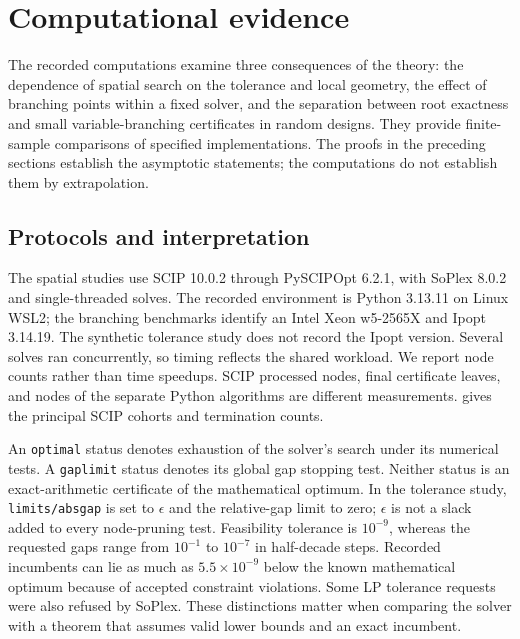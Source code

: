 \section{Computational evidence}
\label{sec:experiments}

The recorded computations examine three consequences of the theory: the
dependence of spatial search on the tolerance and local geometry, the effect
of branching points within a fixed solver, and the separation between root
exactness and small variable-branching certificates in random designs.
They provide finite-sample comparisons of specified implementations.
The proofs in the preceding sections establish the asymptotic statements;
the computations do not establish them by extrapolation.

\subsection{Protocols and interpretation}
\label{experiments:protocols}

The spatial studies use SCIP 10.0.2 through PySCIPOpt 6.2.1, with SoPlex
8.0.2 and single-threaded solves. The recorded environment is Python
3.13.11 on Linux WSL2; the branching benchmarks identify an Intel Xeon
w5-2565X and Ipopt 3.14.19. The synthetic tolerance study does not record
the Ipopt version. Several solves ran concurrently, so timing reflects
the shared workload. We report node counts rather than time speedups.
SCIP processed nodes, final certificate leaves, and nodes of the separate
Python algorithms are different measurements.
 gives the principal SCIP cohorts and
termination counts.



An \texttt{optimal} status denotes exhaustion of the solver's search under
its numerical tests. A \texttt{gaplimit} status denotes its global gap
stopping test. Neither status is an exact-arithmetic certificate of the
mathematical optimum. In the tolerance study, \texttt{limits/absgap} is set
to $\epsilon$ and the relative-gap limit to zero; $\epsilon$ is not a slack
added to every node-pruning test. Feasibility tolerance is $10^{-9}$,
whereas the requested gaps range from $10^{-1}$ to $10^{-7}$ in half-decade
steps. Recorded incumbents can lie as much as $5.5\times10^{-9}$ below the
known mathematical optimum because of accepted constraint violations.
Some LP tolerance requests were also refused by SoPlex. These distinctions
matter when comparing the solver with a theorem that assumes valid lower
bounds and an exact incumbent.

